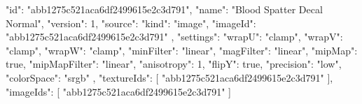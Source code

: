 {
  "id": "abb1275c521aca6df2499615e2c3d791",
  "name": "Blood Spatter Decal Normal",
  "version": 1,
  "source": {
    "kind": "image",
    "imageId": "abb1275c521aca6df2499615e2c3d791"
  },
  "settings": {
    "wrapU": "clamp",
    "wrapV": "clamp",
    "wrapW": "clamp",
    "minFilter": "linear",
    "magFilter": "linear",
    "mipMap": true,
    "mipMapFilter": "linear",
    "anisotropy": 1,
    "flipY": true,
    "precision": "low",
    "colorSpace": "srgb"
  },
  "textureIds": [
    "abb1275c521aca6df2499615e2c3d791"
  ],
  "imageIds": [
    "abb1275c521aca6df2499615e2c3d791"
  ]
}
